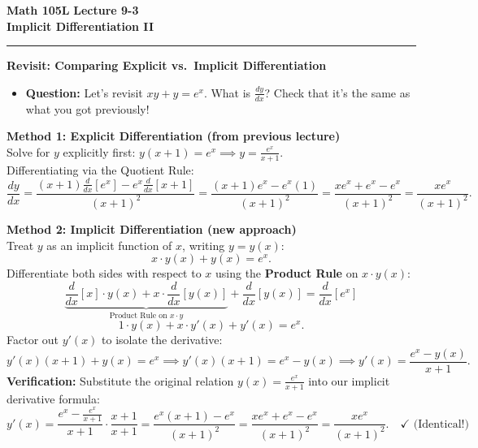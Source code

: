 \documentclass[10.5pt]{article}
\begin{document}
\noindent \textbf{\large Math 105L} \hfill \textbf{\large Lecture 9-3}\\[1pt]
{\textbf{\Large Implicit Differentiation II}}\\[-5pt]
\rule{\textwidth}{1.2pt}

\vspace{0.03in}

\textbf{\large Revisit: Comparing Explicit vs.\ Implicit Differentiation}

\begin{itemize}[leftmargin=1.2em, topsep=1pt, itemsep=2pt]
  \item \textbf{Question:} Let's revisit $xy + y = e^x$. What is $\frac{dy}{dx}$? Check that it's the same as what you got previously!
\end{itemize}

\begin{tcolorbox}[colback=boxbg, colframe=boxframe, boxrule=0.8pt, arc=3pt, left=8pt, right=8pt, top=4pt, bottom=4pt]
\textbf{Method 1: Explicit Differentiation (from previous lecture)}\\[2pt]
Solve for $y$ explicitly first: \quad $y(x+1) = e^x \implies y = \frac{e^x}{x+1}$.\\[2pt]
Differentiating via the Quotient Rule:
\[
  \frac{dy}{dx} = \frac{(x+1)\frac{d}{dx}[e^x] - e^x \frac{d}{dx}[x+1]}{(x+1)^2} = \frac{(x+1)e^x - e^x(1)}{(x+1)^2} = \frac{xe^x + e^x - e^x}{(x+1)^2} = \frac{xe^x}{(x+1)^2}.
\]
\end{tcolorbox}

\vspace{0.02in}

\begin{tcolorbox}[colback=boxbg, colframe=boxframe, boxrule=0.8pt, arc=3pt, left=8pt, right=8pt, top=4pt, bottom=4pt]
\textbf{Method 2: Implicit Differentiation (new approach)}\\[2pt]
Treat $y$ as an implicit function of $x$, writing $y = y(x)$:
\[
  x \cdot y(x) + y(x) = e^x.
\]
Differentiate both sides with respect to $x$ using the \textbf{Product Rule} on $x \cdot y(x)$:
\[
  \underbrace{\frac{d}{dx}[x] \cdot y(x) + x \cdot \frac{d}{dx}[y(x)]}_{\text{Product Rule on } x\cdot y} + \frac{d}{dx}[y(x)] = \frac{d}{dx}[e^x]
\]
\[
  1 \cdot y(x) + x \cdot y'(x) + y'(x) = e^x.
\]
Factor out $y'(x)$ to isolate the derivative:
\[
  y'(x)(x + 1) + y(x) = e^x \implies y'(x)(x + 1) = e^x - y(x) \implies y'(x) = \frac{e^x - y(x)}{x + 1}.
\]
\textbf{Verification:} Substitute the original relation $y(x) = \frac{e^x}{x+1}$ into our implicit derivative formula:
\[
  y'(x) = \frac{e^x - \frac{e^x}{x+1}}{x+1} \cdot \frac{x+1}{x+1} = \frac{e^x(x+1) - e^x}{(x+1)^2} = \frac{xe^x + e^x - e^x}{(x+1)^2} = \frac{xe^x}{(x+1)^2}. \quad \checkmark \text{ (Identical!)}
\]
\end{tcolorbox}
\end{document}
